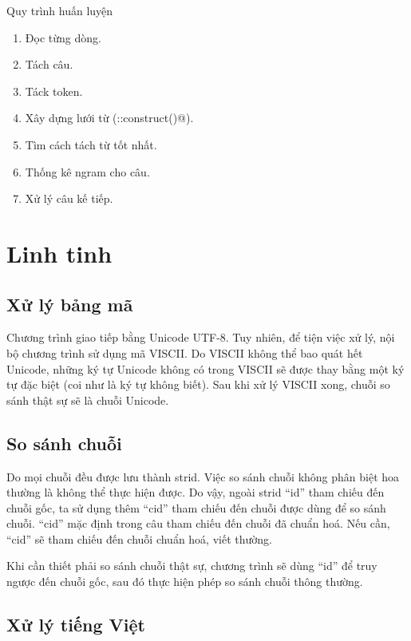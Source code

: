 \documentclass[a4paper,oneside,14pt]{extbook} %
\begin{document}
\begin{algo}
  \caption{Quy trình huấn luyện}
  \label{algo:training}
  \begin{enumerate}
  \item Đọc từng dòng.
  \item Tách câu.
  \item Táck token.
  \item Xây dựng lưới từ (\verb@Lattice::construct()@).
  \item Tìm cách tách từ tốt nhất.
  \item Thống kê n\-gram cho câu.
  \item Xử lý câu kế tiếp.
  \end{enumerate}
\end{algo}

\section{Linh tinh}

\subsection{Xử lý bảng mã}

Chương trình giao tiếp bằng Unicode UTF-8. Tuy nhiên, để tiện việc xử
lý, nội bộ chương trình sử dụng mã VISCII. Do VISCII không thể bao
quát hết Unicode, những ký tự Unicode không có trong VISCII sẽ được
thay bằng một ký tự đặc biệt (coi như là ký tự không biết). Sau khi xử
lý VISCII xong, chuỗi so sánh thật sự sẽ là chuỗi Unicode.

\subsection{So sánh chuỗi}

Do mọi chuỗi đều được lưu thành strid. Việc so sánh chuỗi không phân biệt 
hoa thường là không thể thực hiện được. Do vậy, ngoài strid ``id'' tham chiếu
đến chuỗi gốc, ta sử dụng thêm ``cid'' tham chiếu đến chuỗi được dùng để
so sánh chuỗi. ``cid'' mặc định trong câu tham chiếu đến chuỗi đã
chuẩn hoá. Nếu cần, ``cid'' sẽ tham chiếu đến chuỗi chuẩn hoá, viết
thường.

Khi cần thiết phải so sánh chuỗi thật sự, chương trình sẽ dùng ``id''
để truy ngược đến chuỗi gốc, sau đó thực hiện phép so sánh chuỗi thông thường.

\subsection{Xử lý tiếng Việt}
\end{document}
